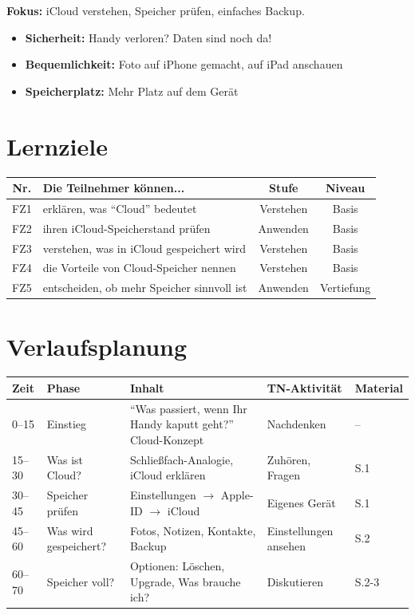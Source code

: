 \documentclass[11pt,a4paper]{article}
\begin{document}
\textbf{Fokus:} iCloud verstehen, Speicher prüfen, einfaches Backup.

\begin{infobox}
\begin{itemize}
    \item \textbf{Sicherheit:} Handy verloren? Daten sind noch da!
    \item \textbf{Bequemlichkeit:} Foto auf iPhone gemacht, auf iPad anschauen
    \item \textbf{Speicherplatz:} Mehr Platz auf dem Gerät
\end{itemize}
\end{infobox}

\section{Lernziele}

\begin{tabular}{|c|p{7cm}|c|c|}
\hline
\textbf{Nr.} & \textbf{Die Teilnehmer können...} & \textbf{Stufe} & \textbf{Niveau} \\
\hline
FZ1 & erklären, was ``Cloud'' bedeutet & Verstehen & Basis \\
FZ2 & ihren iCloud-Speicherstand prüfen & Anwenden & Basis \\
FZ3 & verstehen, was in iCloud gespeichert wird & Verstehen & Basis \\
FZ4 & die Vorteile von Cloud-Speicher nennen & Verstehen & Basis \\
FZ5 & entscheiden, ob mehr Speicher sinnvoll ist & Anwenden & Vertiefung \\
\hline
\end{tabular}

\section{Verlaufsplanung}

\begin{longtable}{|p{1cm}|p{2cm}|p{5cm}|p{3cm}|p{2cm}|}
\hline
\textbf{Zeit} & \textbf{Phase} & \textbf{Inhalt} & \textbf{TN-Aktivität} & \textbf{Material} \\
\hline
0--15 & Einstieg & ``Was passiert, wenn Ihr Handy kaputt geht?'' Cloud-Konzept & Nachdenken & -- \\
\hline
15--30 & Was ist Cloud? & Schließfach-Analogie, iCloud erklären & Zuhören, Fragen & S.1 \\
\hline
30--45 & Speicher prüfen & Einstellungen $\rightarrow$ Apple-ID $\rightarrow$ iCloud & Eigenes Gerät & S.1 \\
\hline
45--60 & Was wird gespeichert? & Fotos, Notizen, Kontakte, Backup & Einstellungen ansehen & S.2 \\
\hline
60--70 & Speicher voll? & Optionen: Löschen, Upgrade, Was brauche ich? & Diskutieren & S.2-3 \\
\hline
\end{longtable}
\end{document}

